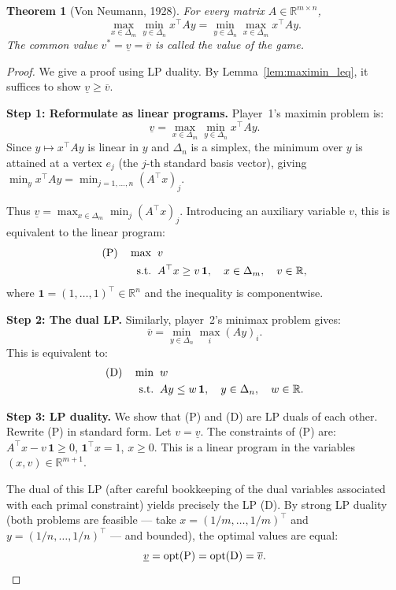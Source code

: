 \documentclass[11pt,a4paper]{article}
\theoremstyle{definition}
\theoremstyle{plain}
\newtheorem{theorem}{Theorem}[section]
\theoremstyle{remark}
\newcommand{\R}{\mathbb{R}}
\begin{document}
\begin{keyresult}
\begin{theorem}[Von Neumann, 1928]
\label{thm:minimax}
For every matrix $A \in \R^{m \times n}$,
\[
    \max_{x \in \Delta_m} \min_{y \in \Delta_n} x^\top A y
    = \min_{y \in \Delta_n} \max_{x \in \Delta_m} x^\top A y.
\]
The common value $v^* = \underline{v} = \overline{v}$ is called the \emph{value}
of the game.
\end{theorem}
\end{keyresult}

\begin{proof}
We give a proof using LP duality. By Lemma~\ref{lem:maximin_leq}, it suffices to
show $\underline{v} \geq \overline{v}$.

\textbf{Step 1: Reformulate as linear programs.}
Player~1's maximin problem is:
\[
    \underline{v} = \max_{x \in \Delta_m} \min_{y \in \Delta_n} x^\top A y.
\]
Since $y \mapsto x^\top A y$ is linear in $y$ and $\Delta_n$ is a simplex, the minimum
over $y$ is attained at a vertex $e_j$ (the $j$-th standard basis vector), giving
$\min_y x^\top A y = \min_{j=1,\ldots,n} (A^\top x)_j$.

Thus $\underline{v} = \max_{x \in \Delta_m} \min_{j} (A^\top x)_j$. Introducing an
auxiliary variable $v$, this is equivalent to the linear program:
\begin{align}
    \text{(P)} \quad \max\;&\; v \notag \\
    \text{s.t.}\;&\; A^\top x \geq v\, \mathbf{1}, \quad x \in \Delta_m, \quad v \in \R,
    \label{eq:primal}
\end{align}
where $\mathbf{1} = (1, \ldots, 1)^\top \in \R^n$ and the inequality is componentwise.

\textbf{Step 2: The dual LP.}
Similarly, player~2's minimax problem gives:
\[
    \overline{v} = \min_{y \in \Delta_n} \max_{i} (Ay)_i.
\]
This is equivalent to:
\begin{align}
    \text{(D)} \quad \min\;&\; w \notag \\
    \text{s.t.}\;&\; Ay \leq w\, \mathbf{1}, \quad y \in \Delta_n, \quad w \in \R.
    \label{eq:dual}
\end{align}

\textbf{Step 3: LP duality.}
We show that (P) and (D) are LP duals of each other. Rewrite (P) in standard form.
Let $v = \underline{v}$. The constraints of (P) are:
$A^\top x - v\, \mathbf{1} \geq 0$, $\mathbf{1}^\top x = 1$, $x \geq 0$.
This is a linear program in the variables $(x, v) \in \R^{m+1}$.

The dual of this LP (after careful bookkeeping of the dual variables associated
with each primal constraint) yields precisely the LP (D). By strong LP duality
(both problems are feasible --- take $x = (1/m, \ldots, 1/m)^\top$ and
$y = (1/n, \ldots, 1/n)^\top$ --- and bounded), the optimal values are equal:
\[
    \underline{v} = \text{opt}(\text{P}) = \text{opt}(\text{D}) = \overline{v}. \qedhere
\]
\end{proof}
\end{document}
